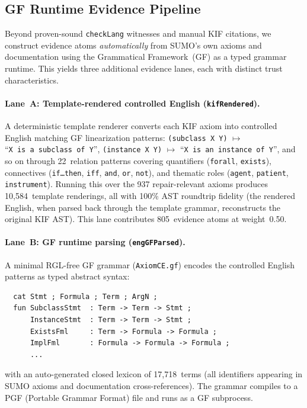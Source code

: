 \documentclass[11pt]{article}
\theoremstyle{definition}
\theoremstyle{plain}
\begin{document}
\subsection{GF Runtime Evidence Pipeline}
\label{sec:gf-evidence}

Beyond proven-sound \texttt{checkLang} witnesses and manual KIF
citations, we construct evidence atoms \emph{automatically} from
SUMO's own axioms and documentation using the Grammatical
Framework~(GF) as a typed grammar runtime.  This yields three
additional evidence lanes, each with distinct trust characteristics.

\paragraph{Lane~A: Template-rendered controlled English (\texttt{kifRendered}).}
A deterministic template renderer converts each KIF axiom into
controlled English matching GF linearization patterns:
\texttt{(subclass~X~Y)} $\mapsto$ ``\texttt{X~is~a~subclass~of~Y}'',
\texttt{(instance~X~Y)} $\mapsto$ ``\texttt{X~is~an~instance~of~Y}'',
and so on through 22~relation patterns covering quantifiers
(\texttt{forall}, \texttt{exists}), connectives
(\texttt{if\ldots then}, \texttt{iff}, \texttt{and}, \texttt{or},
\texttt{not}), and thematic roles (\texttt{agent}, \texttt{patient},
\texttt{instrument}).  Running this over the 937 repair-relevant axioms
produces 10{,}584~template renderings, all with 100\% AST roundtrip
fidelity (the rendered English, when parsed back through the template
grammar, reconstructs the original KIF AST).  This lane contributes
805~evidence atoms at weight~0.50.

\paragraph{Lane~B: GF runtime parsing (\texttt{engGFParsed}).}
A minimal RGL-free GF grammar (\texttt{AxiomCE.gf}) encodes
the controlled English patterns as typed abstract syntax:
\begin{verbatim}
  cat Stmt ; Formula ; Term ; ArgN ;
  fun SubclassStmt  : Term -> Term -> Stmt ;
      InstanceStmt  : Term -> Term -> Stmt ;
      ExistsFml     : Term -> Formula -> Formula ;
      ImplFml       : Formula -> Formula -> Formula ;
      ...
\end{verbatim}
with an auto-generated closed lexicon of 17{,}718~terms
(all identifiers appearing in SUMO axioms and documentation
cross-references).  The grammar compiles to a PGF
(Portable Grammar Format) file and runs as a GF subprocess.
\end{document}
